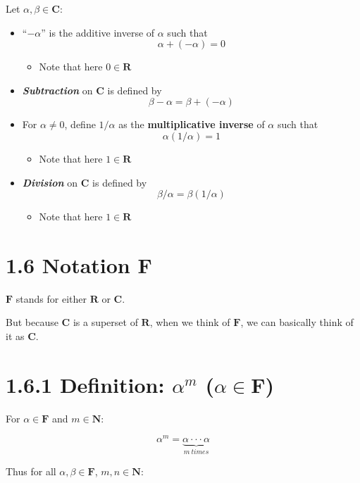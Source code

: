 \documentclass[12pt, letterpaper, oneside]{book}
\begin{document}
Let $\alpha, \beta \in \mathbf{C}$:

\begin{itemize}
  \item ``$-\alpha$'' is the additive inverse of $\alpha$ such that
    \[ \alpha + (-\alpha) = 0 \]
    \begin{itemize}
      \item Note that here $0 \in \mathbf{R}$
    \end{itemize}
  \item \textbf{\textit{Subtraction}} on $\mathbf{C}$ is defined by
    \[ \beta - \alpha = \beta + (-\alpha) \]
  \item For $\alpha \neq 0$, define $1/\alpha$ as the \textbf{multiplicative
    inverse} of $\alpha$ such that
    \[ \alpha(1/\alpha) = 1 \]
    \begin{itemize}
      \item Note that here $1 \in \mathbf{R}$
    \end{itemize}
  \item \textbf{\textit{Division}} on $\mathbf{C}$ is defined by
    \[ \beta/\alpha = \beta(1/\alpha) \]
    \begin{itemize}
      \item Note that here $1 \in \mathbf{R}$
    \end{itemize}
\end{itemize}

\section{1.6 Notation F}

$\mathbf{F}$ stands for either $\mathbf{R}$ or $\mathbf{C}$.

But because $\mathbf{C}$ is a superset of $\mathbf{R}$, when we think of
$\mathbf{F}$, we can basically think of it as $\mathbf{C}$.

\section{1.6.1 Definition: $\alpha^m$ ($\alpha \in \mathbf{F}$)}

For $\alpha \in \mathbf{F}$ and $m \in \mathbf{N}$:

\[ \alpha^m = \underbrace{\alpha\cdot\cdot\cdot\alpha}_{m \ times} \]

Thus for all $\alpha, \beta \in \mathbf{F}$, $m, n \in \mathbf{N}$:
\end{document}
